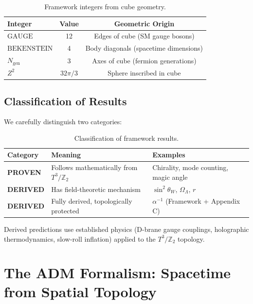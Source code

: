 \documentclass[12pt,a4paper]{article}
\newcommand{\Ztwo}{\mathbb{Z}_2}
\newcommand{\Tthree}{T^3}
\newcommand{\OmegaL}{\Omega_\Lambda}
\newcommand{\sinW}{\sin^2\theta_W}
\newcommand{\Zsq}{Z^2}
\newcommand{\GAUGE}{\text{GAUGE}}
\newcommand{\BEKENSTEIN}{\text{BEKENSTEIN}}
\newcommand{\Ngen}{N_{\text{gen}}}
\begin{document}
\begin{table}[H]
\centering
\begin{tabular}{lcc}
\toprule
\textbf{Integer} & \textbf{Value} & \textbf{Geometric Origin} \\
\midrule
$\GAUGE$ & 12 & Edges of cube (SM gauge bosons) \\
$\BEKENSTEIN$ & 4 & Body diagonals (spacetime dimensions) \\
$\Ngen$ & 3 & Axes of cube (fermion generations) \\
$\Zsq$ & $32\pi/3$ & Sphere inscribed in cube \\
\bottomrule
\end{tabular}
\caption{Framework integers from cube geometry.}
\label{tab:integers}
\end{table}

\subsection{Classification of Results}

We carefully distinguish two categories:

\begin{table}[H]
\centering
\begin{tabular}{lll}
\toprule
\textbf{Category} & \textbf{Meaning} & \textbf{Examples} \\
\midrule
\textbf{PROVEN} & Follows mathematically from $\Tthree/\Ztwo$ & Chirality, mode counting, magic angle \\
\textbf{DERIVED} & Has field-theoretic mechanism & $\sinW$, $\OmegaL$, $r$ \\
\textbf{DERIVED} & Fully derived, topologically protected & $\alpha^{-1}$ (Framework + Appendix C) \\
\bottomrule
\end{tabular}
\caption{Classification of framework results.}
\end{table}

Derived predictions use established physics (D-brane gauge couplings, holographic thermodynamics, slow-roll inflation) applied to the $\Tthree/\Ztwo$ topology.

\section{The ADM Formalism: Spacetime from Spatial Topology}
\label{sec:adm}
\end{document}
